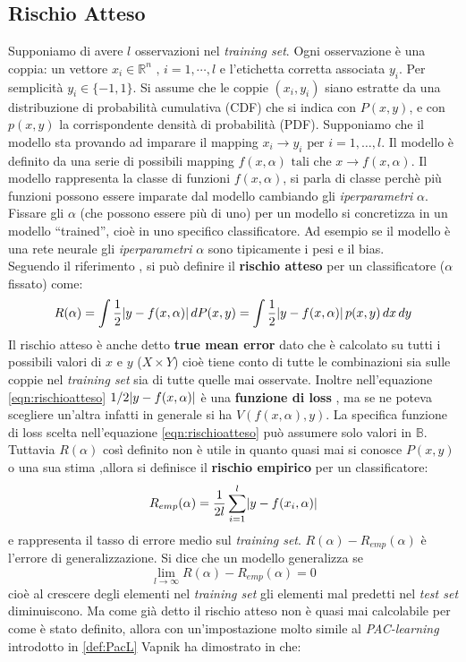 \subsection{Rischio Atteso}
Supponiamo di avere $l$ osservazioni nel \textit{training set}. Ogni osservazione è una coppia: un vettore $x_{i} \in \mathbb{R}^{n} \text{ , } i=1,\cdots,l$ e l'etichetta corretta  associata $y_{i}$. Per semplicità $y_{i} \in \{-1,1\}$. Si assume che le coppie $(x_i,y_i)$ siano estratte da una distribuzione di probabilità cumulativa (CDF) che si indica con $P(x,y)$,  e con $p(x,y)$ la corrispondente densità di probabilità (PDF).  Supponiamo che il modello sta provando ad imparare il mapping $x_i \to y_i \text{ per } i=1,\dots,l$.  Il modello è definito da una serie di possibili mapping $f(x,\alpha) \text{ tali che } x \to f(x,\alpha) $. Il modello rappresenta la classe di funzioni $f(x,\alpha) $, si parla di classe perchè più funzioni possono essere imparate dal modello cambiando gli \textit{iperparametri} $\alpha$.  Fissare gli $\alpha$ (che possono essere più di uno) per un modello si concretizza in un modello ``trained'', cioè in uno specifico classificatore. Ad esempio se il modello è una rete neurale gli \textit{iperparametri} $\alpha$ sono tipicamente i pesi e il bias. \\ Seguendo il riferimento \cite{Vapnik95}, si può definire il \textbf{rischio atteso} per un classificatore ($\alpha$ fissato) come:
\begin{equation}
\label{eqn:rischioatteso}
R(\alpha) = \int \frac{1}{2} \lvert y-f(x,\alpha)\rvert \, dP(x,y) = \int \frac{1}{2} \lvert y-f(x,\alpha)\rvert \, p(x,y) \, dx \, dy
\end{equation}
Il rischio atteso è anche detto \textbf{true mean error}  dato che è calcolato su tutti i possibili valori di $x$ e $y$ ($X \times Y$) cioè tiene conto di tutte le combinazioni sia sulle coppie nel \textit{training set} sia di tutte quelle mai osservate. Inoltre nell'equazione \eqref{eqn:rischioatteso}  $1/2 \lvert y-f(x,\alpha)\rvert$ è una \textbf{funzione di loss} , ma se ne poteva scegliere un'altra infatti in generale si ha $V(f(x,\alpha),y)$. La specifica funzione di loss scelta nell'equazione \eqref{eqn:rischioatteso} può assumere solo valori in $\mathbb{B}$. Tuttavia $R(\alpha)$ così definito non è utile in quanto quasi mai si conosce $P(x,y)$ o una sua stima ,allora si definisce il \textbf{rischio empirico} per un classificatore:
\begin{equation*}
R_{emp}(\alpha) = \frac{1}{2l} \sum_{i=1}^{l}\lvert y-f(x_{i},\alpha)\rvert
\end{equation*}
e rappresenta il tasso di errore medio sul \textit{training set}. $R(\alpha) - R_{emp}(\alpha)$ è l'errore di generalizzazione. Si dice che un modello generalizza se
\begin{equation*}
\lim_{ l \to \infty} R(\alpha) - R_{emp}(\alpha) = 0
\end{equation*}   
cioè al crescere degli elementi nel \textit{training set} gli elementi mal predetti nel \textit{test set} diminuiscono. Ma come già detto il rischio atteso non è quasi mai calcolabile per come è stato definito, allora con un'impostazione molto simile al \textit{PAC-learning} introdotto in \ref{def:PacL} Vapnik ha dimostrato in \cite{Vapnik95}  che:

